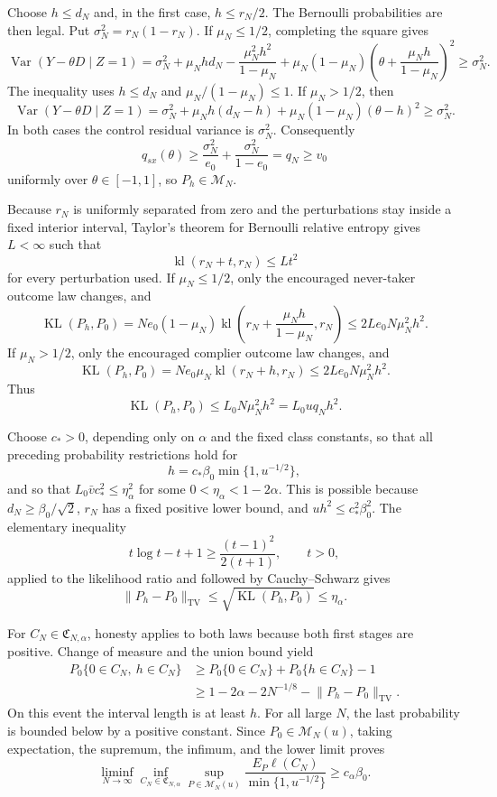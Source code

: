 Choose \(h\le d_N\) and, in the first case, \(h\le r_N/2\). The Bernoulli probabilities are then legal. Put \(\sigma_N^2=r_N(1-r_N)\). If \(\mu_N\le1/2\), completing the square gives
\[
\operatorname{Var}(Y-\theta D\mid Z=1)
=\sigma_N^2+\mu_Nhd_N-\frac{\mu_N^2h^2}{1-\mu_N}
+\mu_N(1-\mu_N)
\left(\theta+\frac{\mu_Nh}{1-\mu_N}\right)^2
\ge\sigma_N^2.
\]
The inequality uses \(h\le d_N\) and \(\mu_N/(1-\mu_N)\le1\). If \(\mu_N>1/2\), then
\[
\operatorname{Var}(Y-\theta D\mid Z=1)
=\sigma_N^2+\mu_Nh(d_N-h)
+\mu_N(1-\mu_N)(\theta-h)^2
\ge\sigma_N^2.
\]
In both cases the control residual variance is \(\sigma_N^2\). Consequently
\[
q_{sx}(\theta)\ge
\frac{\sigma_N^2}{e_0}+\frac{\sigma_N^2}{1-e_0}
=q_N\ge v_0
\]
uniformly over \(\theta\in[-1,1]\), so \(P_h\in\mathcal M_N\).

Because \(r_N\) is uniformly separated from zero and the perturbations stay inside a fixed interior interval, Taylor's theorem for Bernoulli relative entropy gives \(L<\infty\) such that
\[
\operatorname{kl}(r_N+t,r_N)\le Lt^2
\]
for every perturbation used. If \(\mu_N\le1/2\), only the encouraged never-taker outcome law changes, and
\[
\operatorname{KL}(P_h,P_0)
=Ne_0(1-\mu_N)
\operatorname{kl}\left(r_N+\frac{\mu_Nh}{1-\mu_N},r_N\right)
\le2Le_0N\mu_N^2h^2.
\]
If \(\mu_N>1/2\), only the encouraged complier outcome law changes, and
\[
\operatorname{KL}(P_h,P_0)
=Ne_0\mu_N\operatorname{kl}(r_N+h,r_N)
\le2Le_0N\mu_N^2h^2.
\]
Thus
\[
\operatorname{KL}(P_h,P_0)\le L_0N\mu_N^2h^2=L_0uq_Nh^2.
\]

Choose \(c_*>0\), depending only on \(\alpha\) and the fixed class constants, so that all preceding probability restrictions hold for
\[
h=c_*\beta_0\min\{1,u^{-1/2}\},
\]
and so that \(L_0\bar vc_*^2\le\eta_\alpha^2\) for some \(0<\eta_\alpha<1-2\alpha\). This is possible because \(d_N\ge\beta_0/\sqrt2\), \(r_N\) has a fixed positive lower bound, and \(uh^2\le c_*^2\beta_0^2\). The elementary inequality
\[
t\log t-t+1\ge\frac{(t-1)^2}{2(t+1)},\qquad t>0,
\]
applied to the likelihood ratio and followed by Cauchy--Schwarz gives
\[
\lVert P_h-P_0\rVert_{\mathrm{TV}}
\le\sqrt{\operatorname{KL}(P_h,P_0)}\le\eta_\alpha.
\]

For \(C_N\in\mathfrak C_{N,\alpha}\), honesty applies to both laws because both first stages are positive. Change of measure and the union bound yield
\[
\begin{aligned}
P_0\{0\in C_N,\ h\in C_N\}
&\ge P_0\{0\in C_N\}+P_0\{h\in C_N\}-1\\
&\ge1-2\alpha-2N^{-1/8}-\lVert P_h-P_0\rVert_{\mathrm{TV}}.
\end{aligned}
\]
On this event the interval length is at least \(h\). For all large \(N\), the last probability is bounded below by a positive constant. Since \(P_0\in\mathcal M_N(u)\), taking expectation, the supremum, the infimum, and the lower limit proves
\[
\liminf_{N\to\infty}
\inf_{C_N\in\mathfrak C_{N,\alpha}}
\sup_{P\in\mathcal M_N(u)}
\frac{E_P\ell(C_N)}{\min\{1,u^{-1/2}\}}
\ge c_\alpha\beta_0.
\]

